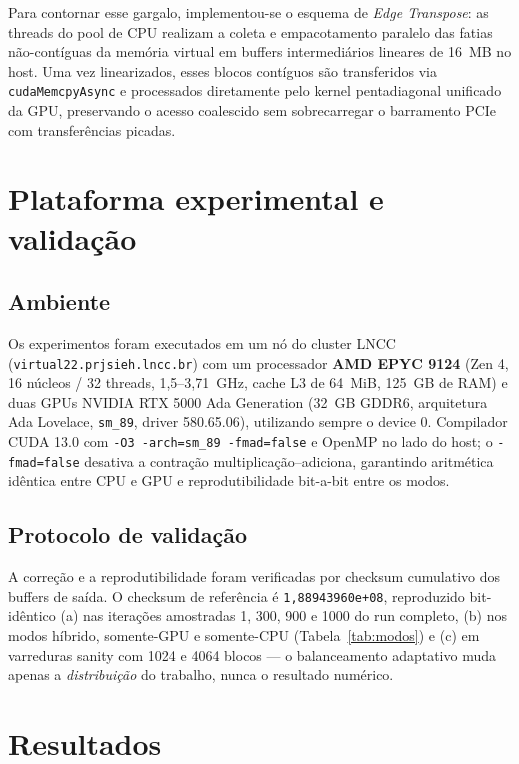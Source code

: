 \documentclass[12pt]{article}
\begin{document}
Para contornar esse gargalo, implementou-se o esquema de \textit{Edge Transpose}: as threads do pool de CPU realizam a coleta e empacotamento paralelo das fatias não-contíguas da memória virtual em buffers intermediários lineares de 16~MB no host. Uma vez linearizados, esses blocos contíguos são transferidos via \texttt{cudaMemcpyAsync} e processados diretamente pelo kernel pentadiagonal unificado da GPU, preservando o acesso coalescido sem sobrecarregar o barramento PCIe com transferências picadas.

\section{Plataforma experimental e validação}\label{sec:exper}

\subsection{Ambiente}

Os experimentos foram executados em um nó do cluster LNCC
(\texttt{virtual22.prjsieh.lncc.br}) com um processador \textbf{AMD EPYC
9124} (Zen 4, 16 núcleos / 32 threads, 1,5--3,71~GHz, cache L3 de 64~MiB,
125~GB de RAM) e duas GPUs NVIDIA RTX 5000 Ada Generation (32~GB GDDR6,
arquitetura Ada Lovelace, \texttt{sm\_89}, driver 580.65.06), utilizando
sempre o device 0. Compilador CUDA 13.0 com \texttt{-O3 -arch=sm\_89
-fmad=false} e OpenMP no lado do host; o \texttt{-fmad=false} desativa a
contração multiplicação--adiciona, garantindo aritmética idêntica entre CPU
e GPU e reprodutibilidade bit-a-bit entre os modos.

\subsection{Protocolo de validação}

A correção e a reprodutibilidade foram verificadas por checksum cumulativo
dos buffers de saída. O checksum de referência é \texttt{1,88943960e+08},
reproduzido bit-idêntico (a) nas iterações amostradas 1, 300, 900 e 1000 do
run completo, (b) nos modos híbrido, somente-GPU e somente-CPU
(Tabela~\ref{tab:modos}) e (c) em varreduras sanity com 1024 e 4064 blocos —
o balanceamento adaptativo muda apenas a \emph{distribuição} do trabalho,
nunca o resultado numérico.

\section{Resultados}\label{sec:res}
\end{document}
